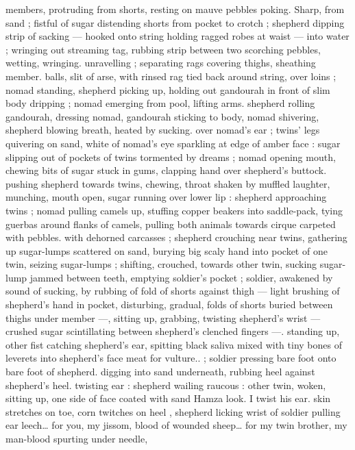 members, protruding from shorts, resting on mauve pebbles poking. 
Sharp, from sand ; fistful of sugar distending shorts from pocket to 
crotch ; shepherd dipping strip of sacking --- hooked onto string 
holding ragged robes at waist --- into water ; wringing out streaming 
tag, rubbing strip between two scorching pebbles, wetting, wringing. 
unravelling ; separating rags covering thighs, sheathing member. 
balls, slit of arse, with rinsed rag tied back around string, over loins 
; nomad standing, shepherd picking up, holding out gandourah in 
front of slim body dripping ; nomad emerging from pool, lifting arms. 
shepherd rolling gandourah, dressing nomad, gandourah sticking to 
body, nomad shivering, shepherd blowing breath, heated by sucking. 
over nomad's ear ; twins' legs quivering on sand, white of nomad's 
eye sparkling at edge of amber face : sugar slipping out of pockets 
of twins tormented by dreams ; nomad opening mouth, chewing bits 
of sugar stuck in gums, clapping hand over shepherd's buttock. 
pushing shepherd towards twins, chewing, throat shaken by muffled 
laughter, munching, mouth open, sugar running over lower lip : 
shepherd approaching twins ; nomad pulling camels up, stuffing 
copper beakers into saddle-pack, tying guerbas around flanks of 
camels, pulling both animals towards cirque carpeted with pebbles. 
with dehorned carcasses ; shepherd crouching near twins, gathering 
up sugar-lumps scattered on sand, burying big scaly hand into 
pocket of one twin, seizing sugar-lumps ; shifting, crouched, towards 
other twin, sucking sugar-lump jammed between teeth, emptying 
soldier's pocket ; soldier, awakened by sound of sucking, by rubbing 
of fold of shorts against thigh --- light brushing of shepherd's hand 
in pocket, disturbing, gradual, folds of shorts buried between thighs 
under member ---, sitting up, grabbing, twisting shepherd's wrist --- 
crushed sugar scintillating between shepherd's clenched fingers ---. 
standing up, other fist catching shepherd's ear, spitting black saliva 
mixed with tiny bones of leverets into shepherd's face{\td} {\gl} meat for 
vulture..{\gr} ; soldier pressing bare foot onto bare foot of shepherd. 
digging into sand underneath, rubbing heel against shepherd's heel. 
twisting ear : shepherd wailing raucous : other twin, woken, sitting 
up, one side of face coated with sand{\td} {\gl} Hamza{\td} look. I twist his ear. 
skin stretches on toe, corn twitches on heel{\td} {\gr}, shepherd licking wrist 
of soldier pulling ear{\td} {\gl} leech{\ldots} for you, my jissom, blood of wounded 
sheep{\ldots} for my twin brother, my man-blood spurting under needle, 
